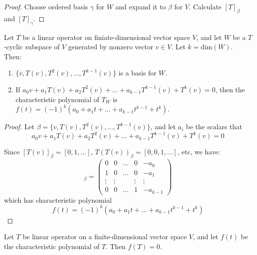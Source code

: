 \begin{proof}
    Choose ordered basis $\gamma$ for $W$ and expand it to $\beta$ for $V$. Calculate $[T]_\beta$ and $[T]_\gamma$.
\end{proof}


\begin{theorem}
    Let $T$ be a linear operator on finiate-dimensional vector space $V$, and let $W$ be a $T$-cyclic subspace of $V$ generated by nonzero vector $v \in V$. Let $k = \text{dim}(W)$. Then:
    \begin{enumerate}
        \item $\{v, T(v), T^2(v), \dots, T^{k-1}(v)\}$ is a basis for $W$.
        \item If $a_0 v + a_1 T(v) + a_2 T^2(v) + \dots + a_{k-1} T^{k-1}(v) + T^k(v) = 0$, then the characteristic polynomial of $T_W$ is $f(t) = (-1)^k (a_0 + a_1 t + \dots + a_{k-1} t^{k-1} + t^k)$.
    \end{enumerate}
\end{theorem}

\begin{proof}
    Let $\beta = \{v, T(v), T^2(v), \dots, T^{k-1}(v)\}$, and let $a_i$ be the scalars that 
    \begin{equation*}
            a_0 v + a_1 T(v) + a_2 T^2(v) + \dots + a_{k-1} T^{k-1}(v) + T^k(v) = 0
    \end{equation*}
    
    Since $[T(v)]_\beta = [0,1,\dots]$, $T(T(v))_\beta = [0,0,1,\dots]$, etc, we have:
    \begin{equation*}
        [T_W]_\beta = \begin{pmatrix}
            0 & 0 & \dots & 0 & - a_0 \\
            1 & 0 & \dots & 0 & -a_1\\
            \vdots & \vdots  & & \vdots & \vdots \\
            0 & 0 & \dots & 1 & - a_{k-1}
        \end{pmatrix}
    \end{equation*}
    which has characteristic polynomial 
    \begin{equation*}
        f(t) = (-1)^k (a_0 + a_1 t + \dots + a_{k-1} t^{k-1} + t^k)
    \end{equation*}
\end{proof}

\begin{theorem}
    Let $T$ be linear operator on a finite-dimensional vector space $V$, and let $f(t)$ be the characteristic polynomial of $T$. Then $f(T) = 0$.
\end{theorem}

